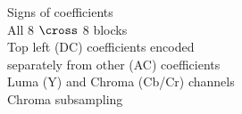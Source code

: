 \documentclass[preview]{standalone}
\begin{document}
Signs of coefficients\\All 8 $\cross$ 8 blocks\\Top left (DC) coefficients encoded\\separately from other (AC) coefficients\\Luma (Y) and Chroma (Cb/Cr) channels\\Chroma subsampling\\
\end{document}
